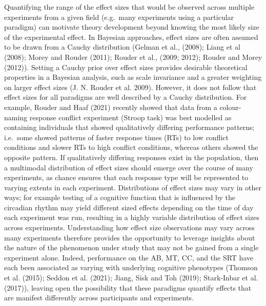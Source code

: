 \documentclass{article}
\begin{document}
Quantifying the range of the effect sizes that would be observed across multiple experiments from a given field (e.g.~many experiments using a particular paradigm) can motivate theory development beyond knowing the most likely size of the experimental effect. In Bayesian approaches, effect sizes are often assumed to be drawn from a Cauchy distribution (Gelman et al., (2008); Liang et al (2008); Morey and Rouder (2011); Rouder et al., (2009; 2012); Rouder and Morey (2012)). Setting a Cauchy prior over effect sizes provides desirable theoretical properties in a Bayesian analysis, such as scale invariance and a greater weighting on larger effect sizes (J. N. Rouder et al. 2009). However, it does not follow that effect sizes for all paradigms are well described by a Cauchy distribution. For example, Rouder and Haaf (2021) recently showed that data from a colour-naming response conflict experiment (Stroop task) was best modelled as containing individuals that showed qualitatively differing performance patterns; i.e.~some showed patterns of faster response times (RTs) to low conflict conditions and slower RTs to high conflict conditions, whereas others showed the opposite pattern. If qualitatively differing responses exist in the population, then a multimodal distribution of effect sizes should emerge over the course of many experiments, as chance ensures that each response type will be represented to varying extents in each experiment. Distributions of effect sizes may vary in other ways; for example testing of a cognitive function that is influenced by the circadian rhythm may yield different sized effects depending on the time of day each experiment was run, resulting in a highly variable distribution of effect sizes across experiments. Understanding how effect size observations may vary across many experiments therefore provides the opportunity to leverage insights about the nature of the phenomenon under study that may not be gained from a single experiment alone. Indeed, performance on the AB, MT, CC, and the SRT have each been associated as varying with underlying cognitive phenotypes (Thomson et al. (2015); Seddon et al. (2021); Jiang, Sisk and Toh (2019); Stark-Inbar et al. (2017)), leaving open the possibility that these paradigms quantify effects that are manifest differently across participants and experiments.
\end{document}
